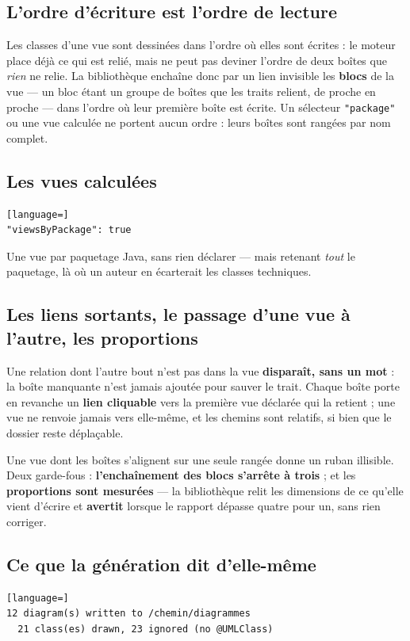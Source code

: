 \documentclass[12pt, a4paper]{article}
\begin{document}
\subsection{L'ordre d'écriture est l'ordre de lecture}
Les classes d'une vue sont dessinées dans l'ordre où elles sont écrites : le moteur place déjà ce qui est relié, mais ne peut pas deviner l'ordre de deux boîtes que \textit{rien} ne relie. La bibliothèque enchaîne donc par un lien invisible les \textbf{blocs} de la vue --- un bloc étant un groupe de boîtes que les traits relient, de proche en proche --- dans l'ordre où leur première boîte est écrite. Un sélecteur \texttt{"package"} ou une vue calculée ne portent aucun ordre : leurs boîtes sont rangées par nom complet.

\subsection{Les vues calculées}
\begin{lstlisting}[language=]
"viewsByPackage": true
\end{lstlisting}
Une vue par paquetage Java, sans rien déclarer --- mais retenant \textit{tout} le paquetage, là où un auteur en écarterait les classes techniques.

\subsection{Les liens sortants, le passage d'une vue à l'autre, les proportions}
Une relation dont l'autre bout n'est pas dans la vue \textbf{disparaît, sans un mot} : la boîte manquante n'est jamais ajoutée pour sauver le trait. Chaque boîte porte en revanche un \textbf{lien cliquable} vers la première vue déclarée qui la retient ; une vue ne renvoie jamais vers elle-même, et les chemins sont relatifs, si bien que le dossier reste déplaçable.

Une vue dont les boîtes s'alignent sur une seule rangée donne un ruban illisible. Deux garde-fous : \textbf{l'enchaînement des blocs s'arrête à trois} ; et les \textbf{proportions sont mesurées} --- la bibliothèque relit les dimensions de ce qu'elle vient d'écrire et \textbf{avertit} lorsque le rapport dépasse quatre pour un, sans rien corriger.

\subsection{Ce que la génération dit d'elle-même}
\begin{lstlisting}[language=]
12 diagram(s) written to /chemin/diagrammes
  21 class(es) drawn, 23 ignored (no @UMLClass)
\end{lstlisting}
\end{document}
